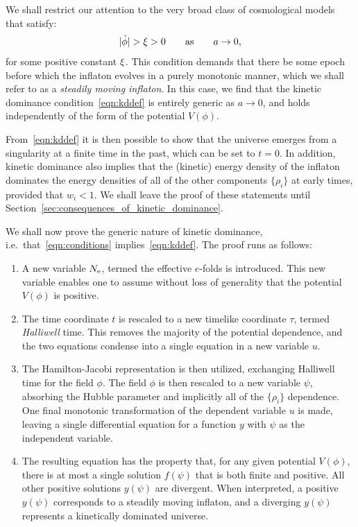 We shall restrict our attention to the very broad class of cosmological models that satisfy:
%
\begin{equation}
|\dot{\phi}| > \xi > 0 \qquad \text{as} \qquad a\to 0, 
\label{eqn:conditions}
\end{equation}
%
for some positive constant \(\xi\).  This condition demands that there be some epoch before which the inflaton evolves in a purely monotonic manner, which we shall refer to as a {\em steadily moving inflaton}. In this case, we find that the kinetic dominance condition~\eqref{eqn:kddef} is entirely generic as \(a \to 0\), and holds independently of the form of the potential \(V(\phi)\).

From~\eqref{eqn:kddef} it is then possible to show that the universe emerges from a singularity at a finite time in the past, which can be set to \(t=0\). In addition, kinetic dominance also implies that the (kinetic) energy density of the inflaton dominates the energy densities of all of the other components \(\{\rho_i\}\) at early times, provided that \(w_i<1\). We shall leave the proof of these statements until Section~\ref{sec:consequences_of_kinetic_dominance}. 

We shall now prove the generic nature of kinetic dominance, i.e.\ that~\eqref{eqn:conditions} implies~\eqref{eqn:kddef}. The proof runs as follows:
%
\renewcommand{\theenumi}{\Alph{enumi}}
%
\begin{enumerate}
  \item                                        
    A new variable \(N_\mathrm{e}\), termed the effective \(e\)-folds is introduced. This new variable enables one to assume without loss of generality that the potential \(V(\phi)\) is positive.
  \item
    The time coordinate \(t\) is rescaled to a new timelike coordinate \(\tau\), termed {\em Halliwell\/} time. This removes the majority of the potential dependence, and the two equations condense into a single equation in a new variable \(u\).
  \item
    The Hamilton-Jacobi representation is then utilized, exchanging Halliwell time for the field \(\phi\). The field \(\phi\) is then rescaled to a new variable \(\psi\), absorbing the Hubble parameter and implicitly all of the \(\{\rho_i\}\) dependence. One final monotonic transformation of the dependent variable \(u\) is made, leaving a single differential equation for a function \(y\) with \(\psi\) as the independent variable.
  \item
    The resulting equation has the property that, for any given potential \(V(\phi)\), there is at most a single solution \(f(\psi)\) that is both finite and positive. All other positive solutions \(y(\psi)\) are divergent.  When interpreted, a positive \(y(\psi)\) corresponds to a steadily moving inflaton, and a diverging \(y(\psi)\) represents a kinetically dominated universe.
\end{enumerate}
%



